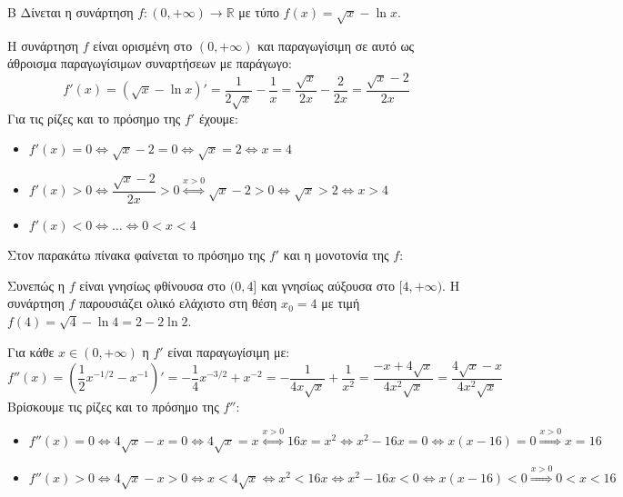 \begin{thema}{Β}
Δίνεται η συνάρτηση $f:(0,+\infty)\to\mathbb{R}$ με τύπο $f(x)=\sqrt{x}-\ln x$.

\begin{erwthma}
\item Η συνάρτηση $f$ είναι ορισμένη στο $(0,+\infty)$ και παραγωγίσιμη σε αυτό ως άθροισμα παραγωγίσιμων συναρτήσεων με παράγωγο:
\[f'(x) = (\sqrt{x} - \ln x)' = \frac{1}{2\sqrt{x}} - \frac{1}{x} = \frac{\sqrt{x}}{2x} - \frac{2}{2x} = \frac{\sqrt{x}-2}{2x}\]
Για τις ρίζες και το πρόσημο της $f'$ έχουμε:
\begin{itemize}
    \item $f'(x) = 0 \Leftrightarrow \sqrt{x}-2 = 0 \Leftrightarrow \sqrt{x}=2 \Leftrightarrow x=4$
    \item $f'(x) > 0 \Leftrightarrow \dfrac{\sqrt{x}-2}{2x} > 0 \stackrel{x>0}{\Leftrightarrow} \sqrt{x}-2 > 0 \Leftrightarrow \sqrt{x}>2 \Leftrightarrow x>4$
    \item $f'(x) < 0 \Leftrightarrow \dots \Leftrightarrow 0<x<4$
\end{itemize}
Στον παρακάτω πίνακα φαίνεται το πρόσημο της $f'$ και η μονοτονία της $f$:
\begin{center}
\end{center}
Συνεπώς η $f$ είναι γνησίως φθίνουσα στο $(0, 4]$ και γνησίως αύξουσα στο $[4, +\infty)$. Η συνάρτηση $f$ παρουσιάζει ολικό ελάχιστο στη θέση $x_0 = 4$ με τιμή $f(4) = \sqrt{4} - \ln 4 = 2 - 2\ln 2$.
\item Για κάθε $x \in (0, +\infty)$ η $f'$ είναι παραγωγίσιμη με:
\[f''(x) = \left( \dfrac{1}{2} x^{-1/2} - x^{-1} \right)' = -\dfrac{1}{4} x^{-3/2} + x^{-2} = -\dfrac{1}{4x\sqrt{x}} + \dfrac{1}{x^2} = \dfrac{-x + 4\sqrt{x}}{4x^2\sqrt{x}} = \dfrac{4\sqrt{x}-x}{4x^2\sqrt{x}}\]
Βρίσκουμε τις ρίζες και το πρόσημο της $f''$:
\begin{itemize}
    \item $f''(x) = 0 \Leftrightarrow 4\sqrt{x}-x = 0 \Leftrightarrow 4\sqrt{x} = x \stackrel{x>0}{\Leftrightarrow} 16x = x^2 \Leftrightarrow x^2-16x=0 \Leftrightarrow x(x-16)=0 \stackrel{x>0}{\Rightarrow} x=16$
    \item $f''(x) > 0 \Leftrightarrow 4\sqrt{x}-x > 0 \Leftrightarrow x < 4\sqrt{x} \Leftrightarrow x^2 < 16x \Leftrightarrow x^2-16x < 0 \Leftrightarrow x(x-16) < 0 \stackrel{x>0}{\Rightarrow} 0<x<16$

\end{itemize}
\end{erwthma}
\end{thema}
